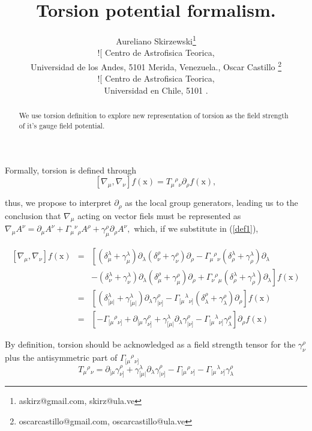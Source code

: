 \documentclass[12pt]{article}
\title{ Torsion potential
formalism.}
\author{{\sf Aureliano Skirzewski}\thanks{{\sf 
askirz@gmail.com, skirz@ula.ve}}
\\![
{\sf Centro de Astrofisica Teorica, } \\
{\sf Universidad de los Andes, 5101 Merida, Venezuela.}, {\sf Oscar Castillo }\thanks{{\sf 
oscarcastillo@gmail.com, oscarcastillo@ula.ve}}
\\![
{\sf Centro de Astrofisica Teorica, } \\
{\sf Universidad en Chile, 5101 .} }
\def\be{\begin{equation}}
\def\ee{\end{equation}}
\def\ba{\begin{eqnarray}}
\def\ea{\end{eqnarray}}
\def\mx{{\mathrm{x}}}
\def\l{\left}
\def\r{\right}
\def\lc{\left[}
\def\rc{\right]}
\def\lp{\left(}
\def\rp{\right)}
\begin{document}
\maketitle
\begin{abstract}
We use torsion definition to explore new representation of
torsion as the field strength of it's gauge field potential.

\end{abstract}

Formally, torsion is defined through \be \label{def1}\l[\nabla _\mu,\nabla_\nu\r]f(\mx)=T_\mu{}^\rho{}_\nu\partial_\rho f(\mx),\ee

thus, we propose to interpret $ \partial_\rho $ as the local group generators, leading us to the conclusion that $\nabla_\mu$ acting on vector fiels must be represented as $\nabla_\mu A^\nu=\partial_\mu A^\nu+\Gamma_\mu{}^\nu{}_\rho A^\rho+\gamma_\mu^\rho\partial_\rho A^\nu,$ 
which, if we substitute in (\ref{def1}),

\ba \l[\nabla _\mu,\nabla_\nu\r]f(\mx)&=&\lc \lp\delta_\mu^\lambda+\gamma_\mu^\lambda\rp\partial_\lambda \lp\delta_\nu^\rho+\gamma_\nu^\rho\rp\partial_\rho - \Gamma_\mu{}^\rho{}_\nu \lp\delta_\rho^\lambda+\gamma_\rho^\lambda\rp\partial_\lambda\r.  \\ \nonumber && \l. -\lp\delta_\nu^\lambda+\gamma_\nu^\lambda\rp\partial_\lambda \lp\delta_\mu^\rho+\gamma_\mu^\rho\rp\partial_\rho + \Gamma_\nu{}^\rho{}_\mu \lp\delta_\rho^\lambda+\gamma_\rho^\lambda\rp\partial_\lambda \rc f(\mx) \\ &=& \lc\lp\delta_{[\mu|}^\lambda+\gamma_{[\mu|}^\lambda\rp\partial_\lambda \gamma_{|\nu]}^\rho - \Gamma_{[\mu}{}^\lambda{}_{\nu]} \lp\delta_\lambda^\rho+\gamma_\lambda^\rho\rp\partial_\rho \rc f(\mx) \\ &=& \lc - \Gamma_{[\mu}{}^\rho{}_{\nu]}+\partial_{[\mu}\gamma_{\nu]}^\rho + \gamma_{[\mu|}^\lambda\partial_\lambda \gamma_{|\nu]}^\rho- \Gamma_{[\mu}{}^\lambda{}_{\nu]} \gamma_\lambda^\rho \rc\partial_\rho f(\mx)\ea 

By definition, torsion should be acknowledged as a field strength tensor for the $\gamma_\nu^\rho$ plus the antisymmetric part of $ \Gamma_{[\mu}{}^\rho{}_{\nu]} $
\be T_\mu {}^\rho {}_\nu = \partial_{[\mu}\gamma_{\nu]}^\rho + \gamma_{[\mu|}^\lambda\partial_\lambda \gamma_{|\nu]}^\rho - \Gamma_{[\mu}{}^\rho{}_{\nu]} - \Gamma_{[\mu}{}^\lambda{}_{\nu]} \gamma_\lambda^\rho \ee
\end{document}
